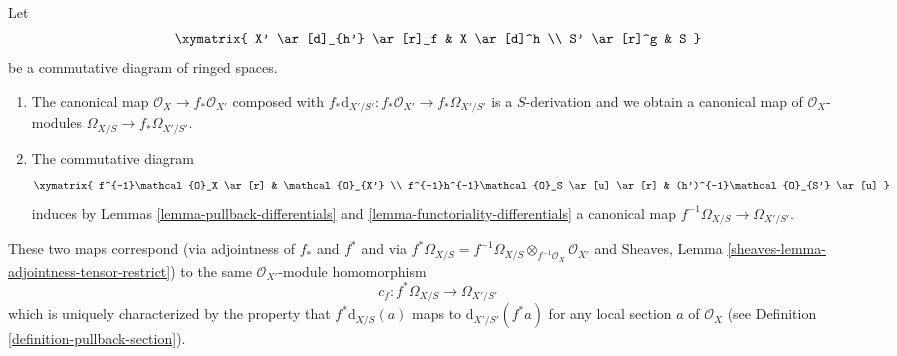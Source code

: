 \begin{lemma}
\label{lemma-functoriality-differentials-ringed-spaces}
Let
$$
\xymatrix{
X' \ar[d]_{h'} \ar[r]_f & X \ar[d]^h \\
S' \ar[r]^g & S
}
$$
be a commutative diagram of ringed spaces.
\begin{enumerate}
\item The canonical map $\mathcal{O}_X \to f_*\mathcal{O}_{X'}$ composed with
$f_*\text{d}_{X'/S'} : f_*\mathcal{O}_{X'} \to f_*\Omega_{X'/S'}$ is a
$S$-derivation and we obtain a canonical map of $\mathcal{O}_X$-modules
$\Omega_{X/S} \to f_*\Omega_{X'/S'}$.
\item The commutative diagram
$$
\xymatrix{
f^{-1}\mathcal{O}_X \ar[r] & \mathcal{O}_{X'} \\
f^{-1}h^{-1}\mathcal{O}_S \ar[u] \ar[r] & (h')^{-1}\mathcal{O}_{S'} \ar[u]
}
$$
induces by Lemmas \ref{lemma-pullback-differentials} and
\ref{lemma-functoriality-differentials}
a canonical map $f^{-1}\Omega_{X/S} \to \Omega_{X'/S'}$.
\end{enumerate}
These two maps correspond (via adjointness of $f_*$ and $f^*$ and
via $f^*\Omega_{X/S} =
f^{-1}\Omega_{X/S} \otimes_{f^{-1}\mathcal{O}_X} \mathcal{O}_{X'}$ and
Sheaves, Lemma \ref{sheaves-lemma-adjointness-tensor-restrict})
to the same $\mathcal{O}_{X'}$-module homomorphism
$$
c_f : f^*\Omega_{X/S} \longrightarrow \Omega_{X'/S'}
$$
which is uniquely characterized by the property that
$f^*\text{d}_{X/S}(a)$ maps to $\text{d}_{X'/S'}(f^*a)$
for any local section $a$ of $\mathcal{O}_X$
(see Definition \ref{definition-pullback-section}).
\end{lemma}

